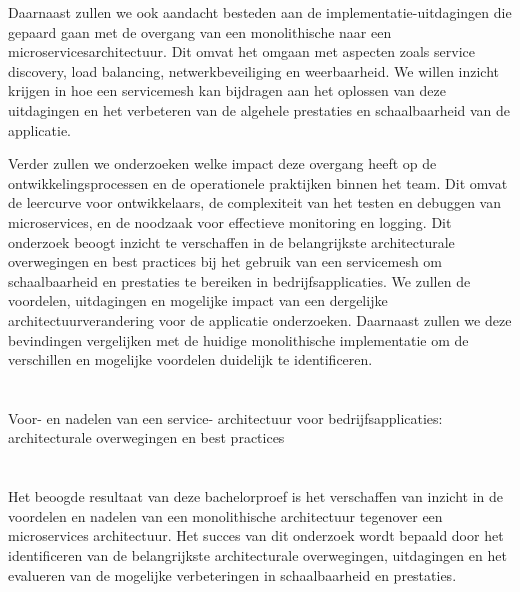 Daarnaast zullen we ook aandacht besteden aan de implementatie-uitdagingen die gepaard gaan met de overgang van een monolithische naar een microservicesarchitectuur. Dit omvat het omgaan met aspecten zoals service discovery, load balancing, netwerkbeveiliging en weerbaarheid. We willen inzicht krijgen in hoe een servicemesh kan bijdragen aan het oplossen van deze uitdagingen en het verbeteren van de algehele prestaties en schaalbaarheid van de applicatie.


Verder zullen we onderzoeken welke impact deze overgang heeft op de ontwikkelingsprocessen en de operationele praktijken binnen het team. Dit omvat de leercurve voor ontwikkelaars, de complexiteit van het testen en debuggen van microservices, en de noodzaak voor effectieve monitoring en logging.
Dit onderzoek beoogt inzicht te verschaffen in de belangrijkste architecturale overwegingen en best practices bij het gebruik van een servicemesh om schaalbaarheid en prestaties te bereiken in bedrijfsapplicaties. We zullen de voordelen, uitdagingen en mogelijke impact van een dergelijke architectuurverandering voor de applicatie onderzoeken. Daarnaast zullen we deze bevindingen vergelijken met de huidige monolithische implementatie om de verschillen en mogelijke voordelen duidelijk te identificeren.


\section{}%
\label{sec:onderzoeksvraag}
Voor- en nadelen van een service-   architectuur voor bedrijfsapplicaties: architecturale overwegingen en best practices

\section{}%
\label{sec:onderzoeksdoelstelling}

Het beoogde resultaat van deze bachelorproef is het verschaffen van inzicht in de voordelen en nadelen van een monolithische architectuur tegenover een microservices architectuur. Het succes van dit onderzoek wordt bepaald door het identificeren van de belangrijkste architecturale overwegingen, uitdagingen en het evalueren van de mogelijke verbeteringen in schaalbaarheid en prestaties.

\section{}%
\label{sec:opzet-bachelorproef}

